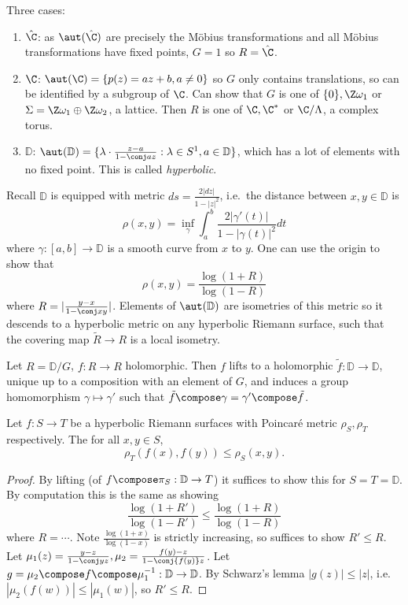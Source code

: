 \documentclass[a4paper]{article}
\newcommand{\D}{\mathbb{D}}
\begin{document}
Three cases:
\begin{enumerate}
\item \(\hat \C\): as \(\aut(\hat \C)\) are precisely the Möbius transformations and all Möbius transformations have fixed points, \(G = 1\) so \(R = \hat \C\).
\item \(\C\): \(\aut(\C) = \{p(z) = az + b, a \ne 0\}\) so \(G\) only contains translations, so can be identified by a subgroup of \(\C\). Can show that \(G\) is one of \(\{0\}, \Z \omega_1\) or \(\Sigma = \Z\omega_1 \oplus \Z\omega_2\), a lattice. Then \(R\) is one of \(\C, \C^*\) or \(\C/\Lambda\), a complex torus.
\item \(\D\): \(\aut(\D) = \{\lambda \cdot \frac{z - a}{1 - \conj a z}: \lambda \in S^1, a \in \D\}\), which has a lot of elements with no fixed point. This is called \emph{hyperbolic}.
\end{enumerate}

Recall \(\D\) is equipped with metric \(ds = \frac{2 |dz|}{1 - |z|^2}\), i.e.\ the distance between \(x, y \in \D\) is
\[
  \rho(x, y) = \inf_\gamma \int_a^b \frac{2 |\gamma'(t)|}{1 - |\gamma(t)|^2} dt
\]
where \(\gamma: [a, b] \to \D\) is a smooth curve from \(x\) to \(y\). One can use the origin to show that
\[
  \rho(x, y) = \frac{\log(1 + R)}{\log(1 - R)}
\]
where \(R = |\frac{y - x}{1 - \conj x y}|\). Elements of \(\aut(\D)\) are isometries of this metric so it descends to a hyperbolic metric on any hyperbolic Riemann surface, such that the covering map \(\tilde R \to R\) is a local isometry.

\begin{ex}
  Let \(R = \D/G\), \(f: R \to R\) holomorphic. Then \(f\) lifts to a holomorphic \(\tilde f: \D \to \D\), unique up to a composition with an element of \(G\), and induces a group homomorphism \(\gamma \mapsto \gamma'\) such that \(\tilde f \compose \gamma = \gamma' \compose \tilde f\).
\end{ex}

\begin{theorem}[Pick]
  Let \(f: S \to T\) be a hyperbolic Riemann surfaces with Poincaré metric \(\rho_S, \rho_T\) respectively. The for all \(x, y \in S\),
  \[
    \rho_T(f(x), f(y)) \leq \rho_S(x, y).
  \]
\end{theorem}

\begin{proof}
  By lifting (of \(f \compose \pi_S: \D \to T\)) it suffices to show this for \(S = T = \D\). By computation this is the same as showing
  \[
    \frac{\log (1 + R')}{\log (1 - R')} \leq \frac{\log (1 + R)}{\log (1 - R)}
  \]
  where \(R = \cdots\). Note \(\frac{\log (1 + x)}{\log (1 - x)}\) is strictly increasing, so suffices to show \(R' \leq R\). Let \(\mu_1(z) = \frac{y - z}{1 - \conj y z}, \mu_2 = \frac{f(y) - z}{1 - \conj{f(y)} z}\). Let \(g = \mu_2 \compose f \compose \mu_1^{-1}: \D \to \D\). By Schwarz's lemma \(|g(z)| \leq |z|\), i.e.\ \(|\mu_2(f(w))| \leq |\mu_1(w)|\), so \(R' \leq R\).
\end{proof}
\end{document}
